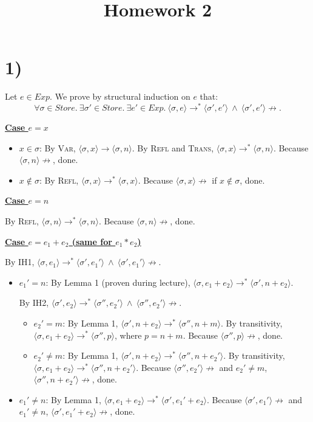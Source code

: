\documentclass[11pt]{article}
\title{Homework 2}
\author{}
\date{}
\newcommand{\Exp}{\mathit{Exp}}
\newcommand{\Store}{\mathit{Store}}
\newcommand{\conf}[2]{\langle #1, #2 \rangle}
\newcommand{\step}{\longrightarrow}
\newcommand{\steps}{\longrightarrow^{*}}
\newcommand{\nostep}{\not\longrightarrow}
\newcommand{\Case}[1]{\medskip\noindent\underline{\textbf{Case #1}}\smallskip\par}
\begin{document}
\maketitle

\section*{1)}

Let $e \in \Exp$. We prove by structural induction on $e$ that:
\[
\forall \sigma \in \Store.\ \exists \sigma' \in \Store.\ \exists e' \in \Exp.\
\conf{\sigma}{e} \steps \conf{\sigma'}{e'} \ \wedge\ \conf{\sigma'}{e'} \nostep.
\]

\Case{$e = x$}

\begin{itemize}
  \item[$\cdot$] $x \in \sigma$: By \textsc{Var}, $\conf{\sigma}{x} \step \conf{\sigma}{n}$.
  By \textsc{Refl} and \textsc{Trans}, $\conf{\sigma}{x} \steps \conf{\sigma}{n}$.
  Because $\conf{\sigma}{n} \nostep$, done.

  \item[$\cdot$] $x \notin \sigma$: By \textsc{Refl}, $\conf{\sigma}{x} \steps \conf{\sigma}{x}$.
  Because $\conf{\sigma}{x} \nostep$ if $x \notin \sigma$, done.
\end{itemize}

\Case{$e = n$}

By \textsc{Refl}, $\conf{\sigma}{n} \steps \conf{\sigma}{n}$. Because $\conf{\sigma}{n} \nostep$, done.

\Case{$e = e_1 + e_2$ (same for $e_1 * e_2$)}

By IH1, $\conf{\sigma}{e_1} \steps \conf{\sigma'}{e_1'} \ \wedge\ \conf{\sigma'}{e_1'} \nostep$.

\begin{itemize}
  \item[$\cdot$] $e_1' = n$: By Lemma 1 (proven during lecture),
  $\conf{\sigma}{e_1+e_2} \steps \conf{\sigma'}{n+e_2}$.

  By IH2, $\conf{\sigma'}{e_2} \steps \conf{\sigma''}{e_2'} \ \wedge\ \conf{\sigma''}{e_2'} \nostep$.

  \begin{itemize}
    \item[$\cdot$] $e_2' = m$: By Lemma 1, $\conf{\sigma'}{n+e_2} \steps \conf{\sigma''}{n+m}$.
    By transitivity, $\conf{\sigma}{e_1+e_2} \steps \conf{\sigma''}{p}$, where $p = n+m$.
    Because $\conf{\sigma''}{p} \nostep$, done.

    \item[$\cdot$] $e_2' \neq m$: By Lemma 1, $\conf{\sigma'}{n+e_2} \steps \conf{\sigma''}{n+e_2'}$.
    By transitivity, $\conf{\sigma}{e_1+e_2} \steps \conf{\sigma''}{n+e_2'}$.
    Because $\conf{\sigma''}{e_2'} \nostep$ and $e_2' \neq m$, $\conf{\sigma''}{n+e_2'} \nostep$, done.
  \end{itemize}

  \item[$\cdot$] $e_1' \neq n$: By Lemma 1, $\conf{\sigma}{e_1+e_2} \steps \conf{\sigma'}{e_1'+e_2}$.
  Because $\conf{\sigma'}{e_1'} \nostep$ and $e_1' \neq n$, $\conf{\sigma'}{e_1'+e_2} \nostep$, done.
\end{itemize}
\end{document}

